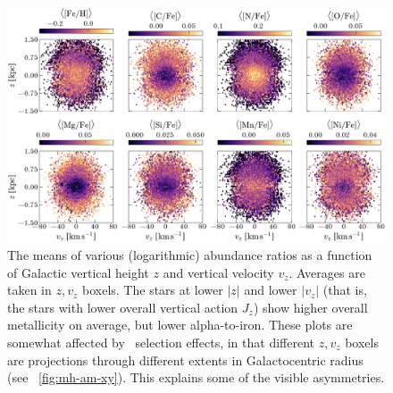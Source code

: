 \documentclass[modern]{aastex63}
\newcommand{\apogee}{\acronym{APOGEE}}
\begin{document}
\begin{figure}[!tp]
  \begin{mdframed}
  \begin{center}
  \includegraphics[width=\textwidth]{abundance-zvz-grid.pdf}
  \end{center}
  \caption{%
    The means of various (logarithmic) abundance ratios as a function of
    Galactic vertical height $z$ and vertical velocity $v_z$.
    Averages are taken in $z, v_z$ boxels.
    The stars at lower $|z|$ and lower $|v_z|$ (that is, the stars with
    lower overall vertical action $J_z$) show higher overall metallicity
    on average, but lower alpha-to-iron.
    These plots are somewhat affected by \apogee\ selection effects, in
    that different $z, v_z$ boxels are projections through different extents
    in Galactocentric radius (see \figurename~\ref{fig:mh-am-xy}).
    This explains some of the visible asymmetries.
  \label{fig:zvz-grid}
  }
  \end{mdframed}
\end{figure}
\end{document}
